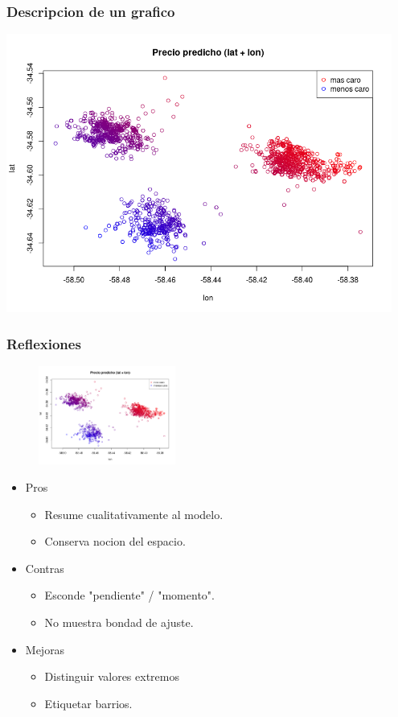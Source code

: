 \documentclass{beamer}
\begin{document}
\begin{frame}
\frametitle{Descripcion de un grafico}
\includegraphics[width=0.95\textwidth]{grafico.png}
\end{frame}

\begin{frame}
\frametitle{Reflexiones}
\begin{figure}
    \begin{center}
        \includegraphics[width=0.4\textwidth]{grafico.png}
    \end{center}
\end{figure} 
\phantom{}
\begin{itemize}
\item Pros
    \begin{itemize}
    \item Resume cualitativamente al modelo.
    \item Conserva nocion del espacio.
    \end{itemize}
\item Contras
    \begin{itemize}
    \item Esconde "pendiente" / "momento".
    \item No muestra bondad de ajuste.
    \end{itemize}
\item Mejoras
    \begin{itemize}
    \item Distinguir valores extremos
    \item Etiquetar barrios.
    \end{itemize}
\end{itemize}
\end{frame}
\end{document}
